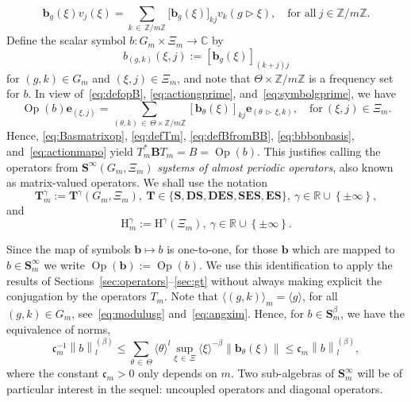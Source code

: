 \documentclass[AHL,Unicode,longabstracts,published]{cedram}
\DeclareMathOperator{\Op}{Op}
\renewcommand{\mathsf}{\mathrm}
\newcommand{\sfH}{\mathsf{H}}
\newcommand{\R}{\mathbb R}
\newcommand{\C}{\mathbb C}
\newcommand{\Z}{\mathbb Z}
\newcommand{\bb}{\mathbf b}
\newcommand{\BB}{\mathbf B}
\newcommand{\BD}{\mathbf D}
\newcommand{\BE}{\mathbf E}
\newcommand{\BS}{\mathbf S}
\newcommand{\BT}{\mathbf T}
\newcommand{\bbb}{\mathbf b}
\newcommand{\be}{\mathbf e}
\newcommand{\Fc}{\mathfrak c}
\newcommand{\act}{\triangleright}
\newcommand{\set}[1]{\left\{ #1 \right\}}
\newcommand{\norm}[1]{\left\| #1 \right\|}
\newcommand{\snorm}[3]{\left\| #1\right\|_{#3}^{(#2)}}
\newcommand{\ang}[1]{\langle #1 \rangle}
\begin{document}
\begin{equation}\label{eq:bbbonbasis}
\bbb_g(\xi)v_j(\xi)=\sum\limits_{k\,\in\,\Z/m\Z}\big[\bb_g(\xi)\big]_{kj}v_k(g\act\xi), \quad \text{for all} \ j\in \Z/m\Z.
\end{equation}
Define the scalar symbol $b:G_m\times\Xi_m\to\C$ by
\begin{equation}\label{eq:symbolgprime}
b_{(g,k)}(\xi,j):=\left[\bbb_g(\xi)\right]_{(k+j)j}
\end{equation}
for $(g,k)\in G_m$ and $(\xi,j)\in\Xi_m$, and note that $\Theta\times \Z/m\Z$ is a frequency set for $b$. In view of~\eqref{eq:defopB}, \eqref{eq:actiongprime}, and~\eqref{eq:symbolgprime}, we have
\begin{equation}\label{eq:actionmapo}
\Op(b) \be_{(\xi,j)} = \sum_{(\theta,k)\,\in\,\Theta \times \Z/m\Z} \left[\bbb_\theta(\xi)\right]_{kj} \be_{(\theta\,\act\,\xi,k)}, \quad \text{for} \ (\xi,j)\in\Xi_m.
\end{equation}
Hence, \eqref{eq:Basmatrixop}, \eqref{eq:defTm}, \eqref{eq:defBfromBB}, \eqref{eq:bbbonbasis}, and~\eqref{eq:actionmapo} yield $T_m^* \BB T_m = B = \Op(b)$. This justifies calling the operators from $\BS^\infty(G_m,\Xi_m)$ \emph{systems of almost periodic operators}, also known as matrix-valued operators. We shall use the notation
\begin{equation}\label{eq:defsystemclasses}
\BT_m^\gamma:=\BT^\gamma(G_m,\Xi_m),\ \BT\in\{\BS, \BD\BS, \BD\BE\BS, \BS\BE\BS, \BE\BS \}, \ \gamma\in\R\cup\set{\pm\infty},
\end{equation}
and
\begin{equation}
\sfH_m^\gamma:=\sfH^\gamma(\Xi_m),\ \gamma\in\R\cup\set{\pm\infty}.
\end{equation}

Since the map of symbols $\bbb\mapsto b$ is one-to-one, for those $\bbb$ which are mapped to $b\in\BS_m^\infty$ we write $\Op(\bbb):=\Op(b)$. We use this identification to apply the results of Sections~\ref{sec:operators}--\ref{sec:gt} without always making explicit the conjugation by the operators $T_m$. Note that $\ang{(g,k)}_m=\ang{g}$, for all $(g,k)\in G_m$, see~\eqref{eq:modulusg} and~\eqref{eq:angxim}. Hence, for $b\in\BS_m^\beta$, we have the equivalence of norms,
\begin{equation}\label{eq:matrixseminorm}
\Fc_m^{-1}\snorm{b}{\beta}{l}\leq\sum_{\theta\,\in\,\Theta} \ang \theta^l \sup_{\xi\,\in\,\Xi} \ang\xi^{-\beta}\norm{\bbb_{\theta}(\xi)}\leq \Fc_m\snorm{b}{\beta}{l},
\end{equation}
where the constant $\Fc_m>0$ only depends on $m$. Two sub-algebras of $\BS_m^\infty$ will be of particular interest in the sequel: uncoupled operators and diagonal operators.
\end{document}

